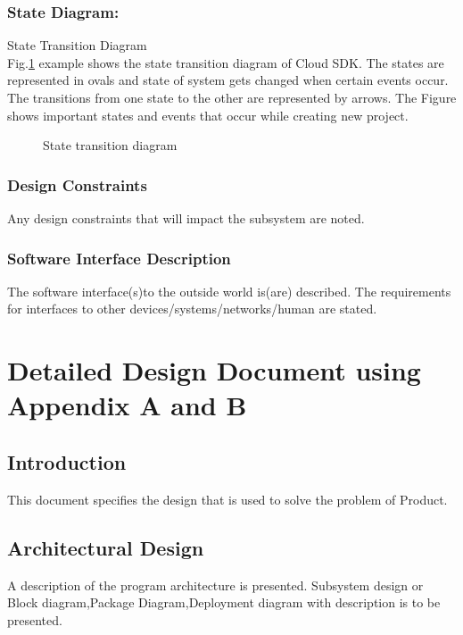 \documentclass[oneside,a4paper,12pt]{report}
\begin{document}
\begin{normalsize}
\subsection{State Diagram:}	
  State Transition Diagram\\
Fig.\ref{fig:state-dig} example shows the state transition diagram of Cloud SDK. The states are
represented in ovals and state of system gets changed when certain events occur. The transitions from one state to the other are represented by arrows. The Figure    shows important states and events that occur while creating new project.

\begin{center}
	\begin{figure}[!htbp]
		\centering
	  \caption{State transition diagram}
	  \label{fig:state-dig}
	\end{figure}
\end{center} 
 
 \subsection{Design Constraints}	
Any design constraints that will impact the subsystem are noted.
 \subsection{Software Interface Description}	 
The software interface(s)to the outside world is(are) described.
The requirements for interfaces to other devices/systems/networks/human are stated.



\chapter{Detailed Design Document using Appendix A and B}
 \section{Introduction}  
This document specifies the design that is used to solve the problem of Product.  
\section{Architectural Design}  
	A description of the program architecture is presented. Subsystem design or Block diagram,Package Diagram,Deployment diagram with description is to be presented.


\end{normalsize}
\end{document}
